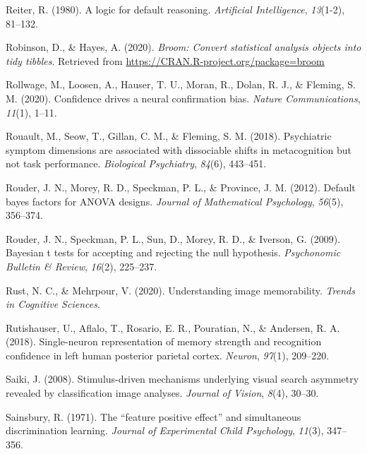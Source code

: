 \documentclass[12pt,twoside]{reedthesis}
\newenvironment{CSLReferences}%
  {}%
  {\par}
\begin{document}
\begin{CSLReferences}{1}{0}
\leavevmode\hypertarget{ref-reiter1980logic}{}%
Reiter, R. (1980). A logic for default reasoning. \emph{Artificial Intelligence}, \emph{13}(1-2), 81--132.

\leavevmode\hypertarget{ref-R-broom}{}%
Robinson, D., \& Hayes, A. (2020). \emph{Broom: Convert statistical analysis objects into tidy tibbles}. Retrieved from \url{https://CRAN.R-project.org/package=broom}

\leavevmode\hypertarget{ref-rollwage2020confidence}{}%
Rollwage, M., Loosen, A., Hauser, T. U., Moran, R., Dolan, R. J., \& Fleming, S. M. (2020). Confidence drives a neural confirmation bias. \emph{Nature Communications}, \emph{11}(1), 1--11.

\leavevmode\hypertarget{ref-rouault2018psychiatric}{}%
Rouault, M., Seow, T., Gillan, C. M., \& Fleming, S. M. (2018). Psychiatric symptom dimensions are associated with dissociable shifts in metacognition but not task performance. \emph{Biological Psychiatry}, \emph{84}(6), 443--451.

\leavevmode\hypertarget{ref-rouder2012default}{}%
Rouder, J. N., Morey, R. D., Speckman, P. L., \& Province, J. M. (2012). Default bayes factors for ANOVA designs. \emph{Journal of Mathematical Psychology}, \emph{56}(5), 356--374.

\leavevmode\hypertarget{ref-rouder2009bayesian}{}%
Rouder, J. N., Speckman, P. L., Sun, D., Morey, R. D., \& Iverson, G. (2009). Bayesian t tests for accepting and rejecting the null hypothesis. \emph{Psychonomic Bulletin \& Review}, \emph{16}(2), 225--237.

\leavevmode\hypertarget{ref-rust2020understanding}{}%
Rust, N. C., \& Mehrpour, V. (2020). Understanding image memorability. \emph{Trends in Cognitive Sciences}.

\leavevmode\hypertarget{ref-rutishauser2018single}{}%
Rutishauser, U., Aflalo, T., Rosario, E. R., Pouratian, N., \& Andersen, R. A. (2018). Single-neuron representation of memory strength and recognition confidence in left human posterior parietal cortex. \emph{Neuron}, \emph{97}(1), 209--220.

\leavevmode\hypertarget{ref-saiki2008stimulus}{}%
Saiki, J. (2008). Stimulus-driven mechanisms underlying visual search asymmetry revealed by classification image analyses. \emph{Journal of Vision}, \emph{8}(4), 30--30.

\leavevmode\hypertarget{ref-sainsbury1971feature}{}%
Sainsbury, R. (1971). The {``feature positive effect''} and simultaneous discrimination learning. \emph{Journal of Experimental Child Psychology}, \emph{11}(3), 347--356.


\end{CSLReferences}
\end{document}
